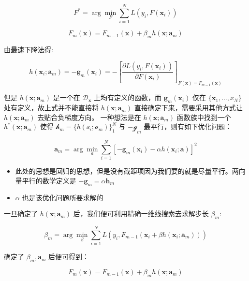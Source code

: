 \documentclass[
  letterpaper,
  DIV=11,
  numbers=noendperiod]{scrartcl}
\begin{document}
\[
F^*=\arg\min_{F}\sum_{i=1}^NL(y_i,F(\mathbf x_i))
\]

\[
F_m(\mathbf x)=F_{m-1}(\mathbf x)+\beta_m h(\mathbf x;\mathbf a_m)
\]

由最速下降法得:

\[
h(\mathbf x_i;\mathbf a_m)=-\mathbf g_m(\mathbf x_i)=-[\frac{\partial L(y_i,F(\mathbf x_i))}{\partial F(\mathbf x_i)}]_{F(\mathbf x)=F_{m-1}(\mathbf x)}
\]

但是 \(h(\mathbf x;\mathbf a_m)\) 是一个在 \(\mathcal D_{\mathbf x}\)
上均有定义的函数，而 \(\mathbf g_m(\mathbf x_i)\) 仅在
\(\{\mathbf x_1,\ldots,x_N\}\) 处有定义，故上式并不能直接将
\(h(\mathbf x;\mathbf a_m)\) 直接确定下来，需要采用其他方式让
\(h(\mathbf x;\mathbf a_m)\) 去贴合负梯度方向。 一种想法是在
\(h(\mathbf x;\mathbf a_m)\) 函数族中找到一个
\(h^*(\mathbf x;\mathbf a_m)\) 使得
\(\mathcal h_m=\{h(\mathcal x_i;\mathcal a_m)\}_1^N\) 与
\(-\mathcal g_m\) 最平行，则有如下优化问题：

\[
\mathbf a_m=\arg\min_a\sum_{i=1}^N[-\mathbf g_m(\mathbf x_i)-\alpha h(\mathbf x_i;\mathbf a)]^2
\]

\begin{tcolorbox}[enhanced jigsaw, arc=.35mm, left=2mm, title=\textcolor{quarto-callout-tip-color}{\faLightbulb}\hspace{0.5em}{寻找负梯度方向说明}, coltitle=black, opacitybacktitle=0.6, colframe=quarto-callout-tip-color-frame, toptitle=1mm, bottomtitle=1mm, opacityback=0, leftrule=.75mm, colbacktitle=quarto-callout-tip-color!10!white, titlerule=0mm, colback=white, bottomrule=.15mm, toprule=.15mm, rightrule=.15mm, breakable]

\begin{itemize}
\item
  此处的思想是回归的思想，但是没有截距项因为我们要的就是尽量平行。两向量平行的数学定义是
  \(-\mathbf g_m=\alpha \mathbf h_m\)
\item
  \(\alpha\) 也是该优化问题所要求解的
\end{itemize}

\end{tcolorbox}

一旦确定了 \(h(\mathbf x;\mathbf a_m)\)
后，我们便可利用精确一维线搜索去求解步长 \(\beta_m\):

\[
\beta_m=\arg\min_{\beta}\sum_{i=1}^NL(y_i,F_{m-1}(\mathbf x_i+\beta h(\mathbf x_i;\mathbf a_m)))
\]

确定了 \(\beta_m,\mathbf a_m\) 后便可得到：

\[
F_m(\mathbf x)=F_{m-1}(\mathbf x)+\beta_m h(\mathbf x;\mathbf a_m)
\]
\end{document}
